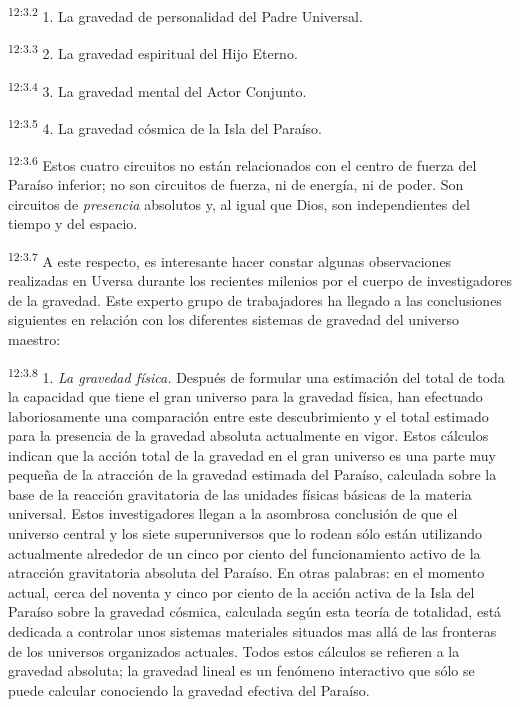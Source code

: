 \par
\textsuperscript{12:3.2} 1. La gravedad de personalidad del Padre Universal.

\par
\textsuperscript{12:3.3} 2. La gravedad espiritual del Hijo Eterno.

\par
\textsuperscript{12:3.4} 3. La gravedad mental del Actor Conjunto.

\par
\textsuperscript{12:3.5} 4. La gravedad cósmica de la Isla del Paraíso.

\par
\textsuperscript{12:3.6} Estos cuatro circuitos no están relacionados con el centro de fuerza del Paraíso inferior; no son circuitos de fuerza, ni de energía, ni de poder. Son circuitos de \textit{presencia} absolutos y, al igual que Dios, son independientes del tiempo y del espacio.

\par
\textsuperscript{12:3.7} A este respecto, es interesante hacer constar algunas observaciones realizadas en Uversa durante los recientes milenios por el cuerpo de investigadores de la gravedad. Este experto grupo de trabajadores ha llegado a las conclusiones siguientes en relación con los diferentes sistemas de gravedad del universo maestro:

\par
\textsuperscript{12:3.8} 1. \textit{La gravedad física.} Después de formular una estimación del total de toda la capacidad que tiene el gran universo para la gravedad física, han efectuado laboriosamente una comparación entre este descubrimiento y el total estimado para la presencia de la gravedad absoluta actualmente en vigor. Estos cálculos indican que la acción total de la gravedad en el gran universo es una parte muy pequeña de la atracción de la gravedad estimada del Paraíso, calculada sobre la base de la reacción gravitatoria de las unidades físicas básicas de la materia universal. Estos investigadores llegan a la asombrosa conclusión de que el universo central y los siete superuniversos que lo rodean sólo están utilizando actualmente alrededor de un cinco por ciento del funcionamiento activo de la atracción gravitatoria absoluta del Paraíso. En otras palabras: en el momento actual, cerca del noventa y cinco por ciento de la acción activa de la Isla del Paraíso sobre la gravedad cósmica, calculada según esta teoría de totalidad, está dedicada a controlar unos sistemas materiales situados mas allá de las fronteras de los universos organizados actuales. Todos estos cálculos se refieren a la gravedad absoluta; la gravedad lineal es un fenómeno interactivo que sólo se puede calcular conociendo la gravedad efectiva del Paraíso.

